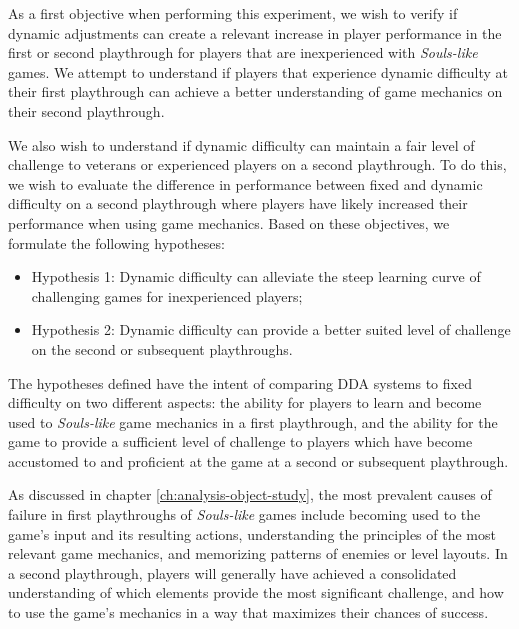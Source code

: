 As a first objective when performing this experiment, we wish to verify if dynamic adjustments can create a relevant increase in player performance in the first or second playthrough for players that are inexperienced with \emph{Souls-like} games. We attempt to understand if players that experience dynamic difficulty at their first playthrough can achieve a better understanding of game mechanics on their second playthrough.

We also wish to understand if dynamic difficulty can maintain a fair level of challenge to veterans or experienced players on a second playthrough. To do this, we wish to evaluate the difference in performance between fixed and dynamic difficulty on a second playthrough where players have likely increased their performance when using game mechanics. Based on these objectives, we formulate the following hypotheses:

\begin{itemize}
    \item{Hypothesis 1: Dynamic difficulty can alleviate the steep learning curve of challenging games for inexperienced players;}
    \item{Hypothesis 2: Dynamic difficulty can provide a better suited level of challenge on the second or subsequent playthroughs.}
\end{itemize}

The hypotheses defined have the intent of comparing DDA systems to fixed difficulty on two different aspects: the ability for players to learn and become used to \emph{Souls-like} game mechanics in a first playthrough, and the ability for the game to provide a sufficient level of challenge to players which have become accustomed to and proficient at the game at a second or subsequent playthrough.


As discussed in chapter \ref{ch:analysis-object-study}, the most prevalent causes of failure in first playthroughs of \emph{Souls-like} games include becoming used to the game's input and its resulting actions, understanding the principles of the most relevant game mechanics, and memorizing patterns of enemies or level layouts. In a second playthrough, players will generally have achieved a consolidated understanding of which elements provide the most significant challenge, and how to use the game's mechanics in a way that maximizes their chances of success.

